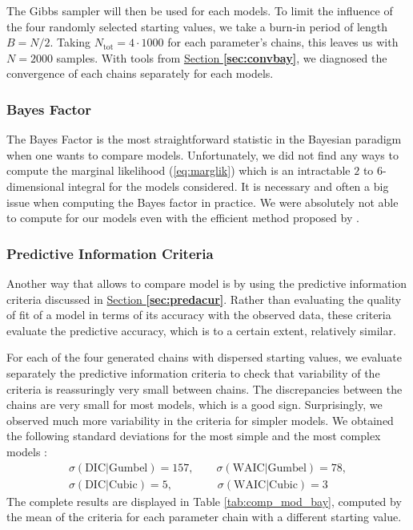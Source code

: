 The Gibbs sampler will then be used for each models. To limit the influence of the four randomly selected starting values, we take a burn-in period of length $B=N/2$. Taking $N_\text{tot}=4\cdot 1000$ for each parameter's chains, this leaves us with $N=2000$ samples.
With tools from \hyperref[sec:convbay]{Section \textbf{\ref{sec:convbay}}}, we diagnosed the convergence of each chains separately for each models.

\subsubsection*{Bayes Factor}

The Bayes Factor is the most straightforward statistic in the Bayesian paradigm when one wants to compare models.
Unfortunately, we did not find any ways to compute the marginal likelihood (\ref{eq:marglik}) which is an intractable $2$ to $6$-dimensional integral for the models considered. It is necessary and often a big issue when computing the Bayes factor in practice. 
We were absolutely not able to compute for our models even with the efficient method proposed by \citet{chib_1995}.

 \subsubsection*{Predictive Information Criteria}
 
 
 Another way that allows to compare model is by using the predictive information criteria discussed in \hyperref[sec:predacur]{Section \textbf{\ref{sec:predacur}}}. Rather than evaluating the quality of fit of a model in terms of its accuracy with the observed data, these criteria evaluate the predictive accuracy,
 which is to a certain extent, relatively similar. 
  
 
 For each of the four generated chains with dispersed starting values, we evaluate separately the predictive information criteria  to check that variability of the criteria is reassuringly very small between chains. The discrepancies between the chains are very small for most models, which is a good sign. Surprisingly, we observed much more variability in the criteria for simpler models. We obtained the following standard deviations for the most simple and the most complex models :
 \begin{equation*}
 \begin{aligned}
\sigma(\text{DIC}|\text{Gumbel}) = 157, \qquad \sigma(\text{WAIC}|\text{Gumbel}) = 78, \\ 
\sigma(\text{DIC}|\text{Cubic}) = 5, \qquad \qquad 
\sigma(\text{WAIC}|\text{Cubic}) = 3 \quad
\end{aligned} 
 \end{equation*}
The complete results are displayed in Table \ref{tab:comp_mod_bay}, computed by the mean of the criteria for each parameter chain with a different starting value. 

